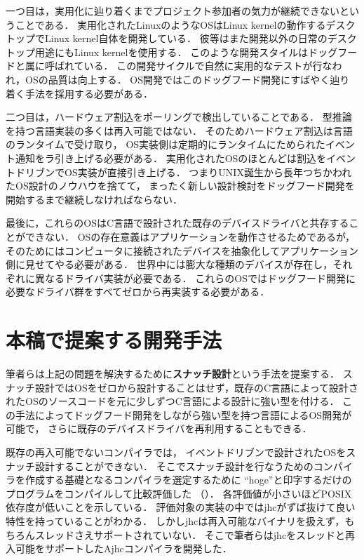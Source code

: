 \documentclass[submit,techreq,noauthor]{ipsj}
\begin{document}
一つ目は，実用化に辿り着くまでプロジェクト参加者の気力が継続できないということである．
実用化されたLinuxのようなOSはLinux kernelの動作するデスクトップでLinux kernel自体を開発している．
彼等はまた開発以外の日常のデスクトップ用途にもLinux kernelを使用する．
このような開発スタイルはドッグフードと属に呼ばれている．
この開発サイクルで自然に実用的なテストが行なわれ，OSの品質は向上する．
OS開発ではこのドッグフード開発にすばやく辿り着く手法を採用する必要がある．

二つ目は，ハードウェア割込をポーリングで検出していることである．
型推論を持つ言語実装の多くは再入可能ではない．
そのためハードウェア割込は言語のランタイムで受け取り，
OS実装側は定期的にランタイムにためられたイベント通知をラ引き上げる必要がある．
実用化されたOSのほとんどは割込をイベントドリブンでOS実装が直接引き上げる．
つまりUNIX誕生から長年つちかわれたOS設計のノウハウを捨てて，
まったく新しい設計検討をドッグフード開発を開始するまで継続しなければならない．

最後に，これらのOSはC言語で設計された既存のデバイスドライバと共存することができない．
OSの存在意義はアプリケーションを動作させるためであるが，
そのためにはコンピュータに接続されたデバイスを抽象化してアプリケーション側に見せてやる必要がある．
世界中には膨大な種類のデバイスが存在し，それぞれに異なるドライバ実装が必要である．
これらのOSではドッグフード開発に必要なドライバ群をすべてゼロから再実装する必要がある．

\section{本稿で提案する開発手法}

筆者らは上記の問題を解決するために\textbf{スナッチ設計}という手法を提案する．
スナッチ設計ではOSをゼロから設計することはせず，既存のC言語によって設計されたOSのソースコードを元に少しずつC言語による設計に強い型を付ける．
この手法によってドッグフード開発をしながら強い型を持つ言語によるOS開発が可能で，
さらに既存のデバイスドライバを再利用することもできる．

既存の再入可能でないコンパイラでは，
イベントドリブンで設計されたOSをスナッチ設計することができない．
そこでスナッチ設計を行なうためのコンパイラを作成する基礎となるコンパイラを選定するために
``hoge''と印字するだけのプログラムをコンパイルして比較評価した
（）．
各評価値が小さいほどPOSIX依存度が低いことを示している．
評価対象の実装の中ではjhc\cite{jhc}がずば抜けて良い特性を持っていることがわかる．
しかしjhcは再入可能なバイナリを扱えず，もちろんスレッドさえサポートされていない．
そこで筆者らはjhcをスレッドと再入可能をサポートしたAjhcコンパイラを開発した\cite{j-ikamusume5}．
\end{document}

